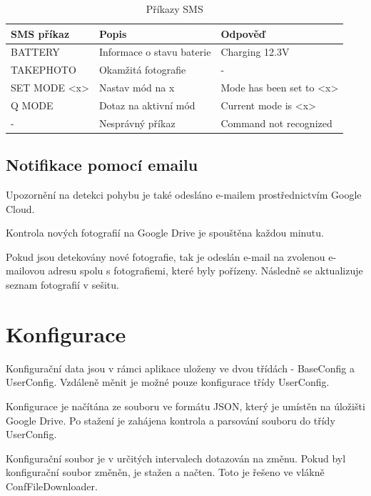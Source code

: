 \begin{table}[h]
\centering
\caption{Příkazy SMS}
\label{sms}
\begin{tabular}{|l|l|l|}
\hline
\textbf{SMS příkaz} & \textbf{Popis}            & \textbf{Odpověď} \\ \hline
BATTERY             & Informace o stavu baterie & Charging 12.3V     \\ \hline
TAKEPHOTO           & Okamžitá fotografie       &   -               \\ \hline
SET MODE <x>          & Nastav mód na x           & Mode has been set to <x>     \\ \hline
Q MODE              & Dotaz na aktivní mód      & Current mode is <x>     \\ \hline
 -                   & Nesprávný příkaz     &   Command not recognized                \\ \hline

\end{tabular}
\end{table}

\subsection*{Notifikace pomocí emailu}

Upozornění na detekci pohybu je také odesláno e-mailem prostřednictvím Google Cloud.

Kontrola nových fotografií na Google Drive je spouštěna každou minutu.

Pokud jsou detekovány nové fotografie, tak je odeslán e-mail na zvolenou e-mailovou adresu spolu s fotografiemi, které byly pořízeny. Následně se aktualizuje seznam fotografií v sešitu.


\section{Konfigurace}

Konfigurační data jsou v rámci aplikace uloženy ve dvou třídách - BaseConfig a UserConfig. Vzdáleně měnit je možné pouze konfigurace třídy UserConfig.

Konfigurace je načítána ze souboru ve formátu JSON, který je umístěn na úložišti Google Drive. Po stažení je zahájena kontrola a parsování souboru do třídy UserConfig.

Konfigurační soubor je v určitých intervalech dotazován na změnu. Pokud byl konfigurační soubor změněn, je stažen a načten. Toto je řešeno ve vlákně ConfFileDownloader.

